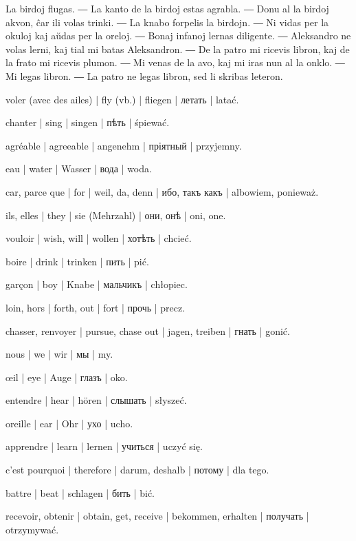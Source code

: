 
La birdoj flugas. ― La kanto de la birdoj estas agrabla. ― Donu al la birdoj akvon, ĉar ili volas trinki. ― La knabo forpelis la birdojn. ― Ni vidas per la okuloj kaj aŭdas per la oreloj. ― Bonaj infanoj lernas diligente. ― Aleksandro ne volas lerni, kaj tial mi batas Aleksandron. ― De la patro mi ricevis libron, kaj de la frato mi ricevis plumon. ― Mi venas de la avo, kaj mi iras nun al la onklo. ― Mi legas libron. ― La patro ne legas libron, sed li skribas leteron.

\begin{ekzvocab}{1em}
 voler (avec des ailes) | fly (vb.) | fliegen | летать | latać.

 chanter | sing | singen | пѣть | śpiewać.

 agréable | agreeable | angenehm | пріятный | przyjemny.

 eau | water | Wasser | вода | woda.

 car, parce que | for | weil, da, denn | ибо, такъ какъ | albowiem, ponieważ.

 ils, elles | they | sie (Mehrzahl) | они, онѣ | oni, one.

 vouloir | wish, will | wollen | хотѣть | chcieć.

 boire | drink | trinken | пить | pić.

 garçon | boy | Knabe | мальчикъ | chłopiec.

 loin, hors | forth, out | fort | прочь | precz.

 chasser, renvoyer | pursue, chase out | jagen, treiben | гнать | gonić.

 nous | we | wir | мы | my.

 œil | eye | Auge | глазъ | oko.

 entendre | hear | hören | слышать | słyszeć.

 oreille | ear | Ohr | ухо | ucho.

 apprendre | learn | lernen | учиться | uczyć się.

 c’est pourquoi | therefore | darum, deshalb | потому | dla tego.

 battre | beat | schlagen | бить | bić.

 recevoir, obtenir | obtain, get, receive | bekommen, erhalten | получать | otrzymywać.


\end{ekzvocab}
